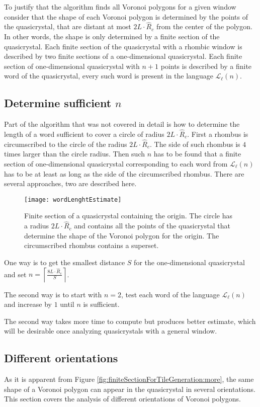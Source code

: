 \documentclass[text.tex]{subfiles}
\begin{document}
To justify that the algorithm finds all Voronoi polygons for a given window consider that the shape of each Voronoi polygon is determined by the points of the quasicrystal, that are distant at most $2L\cdot\hat{R}_c$ from the center of the polygon. In other words, the shape is only determined by a finite section of the quasicrystal. Each finite section of the quasicrystal with a rhombic window is described by two finite sections of a one-dimensional quasicrystal. Each finite section of one-dimensional quasicrystal with $n+1$ points is described by a finite word of the quasicrystal, every such word is present in the language $\mathcal{L}_{\ell}(n)$.

\subsection{Determine sufficient $n$}
Part of the algorithm that was not covered in detail is how to determine the length of a word sufficient to cover a circle of radius $2L\cdot\hat{R}_c$. First a rhombus is circumscribed to the circle of the radius $2L\cdot\hat{R}_c$. The side of such rhombus is $4$ times larger than the circle radius. Then such $n$ has to be found that a finite section of one-dimensional quasicrystal corresponding to each word from $\mathcal{L}_{\ell}(n)$ has to be at least as long as the side of the circumscribed rhombus. 
There are several approaches, two are described here. 

\begin{figure}[h!]
\centering
\texttt{[image: wordLenghtEstimate]}
\caption{Finite section of a quasicrystal containing the origin. The circle has a radius $2L\cdot\hat{R}_c$ and contains all the points of the quasicrystal that determine the shape of the Voronoi polygon for the origin. The circumscribed rhombus contains a superset.}
\label{fig:wordLenghtEstimate}
\end{figure}

One way is to get the smallest distance $S$ for the one-dimensional quasicrystal and set $n = \left\lceil\frac{8L\cdot\hat{R}_c}{S}\right\rceil$. 

The second way is to start with $n=2$, test each word of the language $\mathcal{L}_{\ell}(n)$ and increase by $1$ until $n$ is sufficient. 

The second way takes more time to compute but produces better estimate, which will be desirable once analyzing quasicrystals with a general window.

\subsection{Different orientations}
As it is apparent from Figure \ref{fig:finiteSectionForTileGeneration:more}, the same shape of a Voronoi polygon can appear in the quasicrystal in several orientations. This section covers the analysis of different orientations of Voronoi polygons. 
\end{document}

